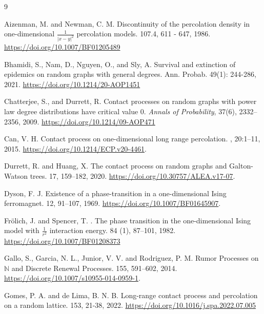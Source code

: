 \documentclass[a4paper,oneside,12pt]{amsart}
\theoremstyle{plain}
\theoremstyle{definition}
\theoremstyle{remark}
\begin{document}
\begin{thebibliography}{9}

Aizenman, M. and Newman, C. M. 
\newblock Discontinuity of the percolation density in one-dimensional $\frac{1}{|x-y|^2}$ percolation models. 
 107.4, 611 - 647, 1986.
\newblock \url{https://doi.org/10.1007/BF01205489}

Bhamidi, S., Nam, D., Nguyen, O., and Sly, A.
\newblock Survival and extinction of epidemics on random graphs with general degrees. \newblock Ann. Probab. 49(1): 244-286, 2021. \newblock \url{https://doi.org/10.1214/20-AOP1451} 

Chatterjee, S., and Durrett, R. 
\newblock Contact processes on random graphs with power law degree distributions have critical value 0.
\newblock \emph{Annals of Probability}, 37(6), 2332--2356, 2009.  
\newblock \url{https://doi.org/10.1214/09-AOP471}

Can, V. H.
\newblock Contact process on one-dimensional long range percolation.
, 20:1--11, 2015.
\newblock \url{https://doi.org/10.1214/ECP.v20-4461}.

Durrett, R. and Huang, X. 
\newblock The contact process on random graphs and Galton-Watson trees. 
 17, 159–182, 2020.
\newblock \url{https://doi.org/10.30757/ALEA.v17-07}.

Dyson, F. J. 
\newblock Existence of a phase-transition in a one-dimensional Ising ferromagnet. 
 12, 91–107, 1969. 
\newblock \url{https://doi.org/10.1007/BF01645907}.

Fr\"olich, J. and Spencer, T. . 
\newblock The phase transition in the one-dimensional Ising model with $\frac{1}{r^2}$ interaction energy. 
 84 (1), 87–101, 1982.
\newblock \url{https://doi.org/10.1007/BF01208373}

Gallo, S.,  Garcia, N. L., Junior, V. V. and Rodriguez, P. M.
\newblock Rumor Processes on $\mathbb{N}$ and Discrete Renewal Processes.
 155, 591–602, 2014. 
\newblock \url{https://doi.org/10.1007/s10955-014-0959-1}.

Gomes, P. A. and de Lima, B. N. B.
\newblock Long-range contact process and percolation on a random lattice.
 153, 21-38, 2022.
\newblock \url{https://doi.org/10.1016/j.spa.2022.07.005}


\end{thebibliography}
\end{document}

